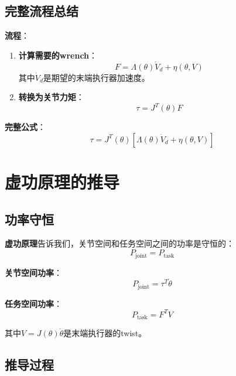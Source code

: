 \documentclass[12pt,a4paper]{article}
\begin{document}
\subsection{完整流程总结}

\textbf{流程}：
\begin{enumerate}
\item \textbf{计算需要的wrench}：
\begin{equation}
F = \Lambda(\theta)\dot{V}_d + \eta(\theta, V)
\end{equation}
其中$\dot{V}_d$是期望的末端执行器加速度。

\item \textbf{转换为关节力矩}：
\begin{equation}
\tau = J^T(\theta)F
\end{equation}
\end{enumerate}

\textbf{完整公式}：
\begin{equation}
\tau = J^T(\theta)\left[\Lambda(\theta)\dot{V}_d + \eta(\theta, V)\right] \tag{*}
\end{equation}

\section{虚功原理的推导}

\subsection{功率守恒}

\textbf{虚功原理}告诉我们，关节空间和任务空间之间的功率是守恒的：
\begin{equation}
P_{\text{joint}} = P_{\text{task}}
\end{equation}

\textbf{关节空间功率}：
\begin{equation}
P_{\text{joint}} = \tau^T\dot{\theta}
\end{equation}

\textbf{任务空间功率}：
\begin{equation}
P_{\text{task}} = F^T V
\end{equation}

其中$V = J(\theta)\dot{\theta}$是末端执行器的twist。

\subsection{推导过程}
\end{document}
